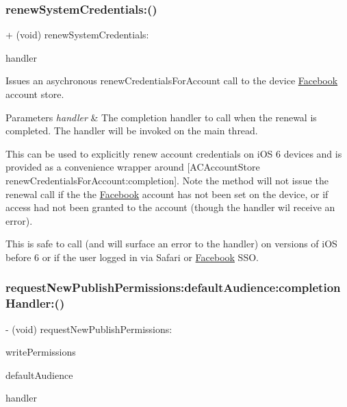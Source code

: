 \subsubsection{\texorpdfstring{renew\+System\+Credentials\+:()}{renewSystemCredentials:()}\hspace{0.1cm}{\footnotesize\ttfamily [5/5]}}
{\footnotesize\ttfamily + (void) renew\+System\+Credentials\+: \begin{DoxyParamCaption}\item[{(F\+B\+Session\+Renew\+System\+Credentials\+Handler)}]{handler }\end{DoxyParamCaption}}

Issues an asychronous renew\+Credentials\+For\+Account call to the device \hyperlink{interfaceFacebook}{Facebook} account store.


\begin{DoxyParams}{Parameters}
{\em handler} & The completion handler to call when the renewal is completed. The handler will be invoked on the main thread.\\
\hline
\end{DoxyParams}
This can be used to explicitly renew account credentials on i\+OS 6 devices and is provided as a convenience wrapper around {\ttfamily \mbox{[}A\+C\+Account\+Store renew\+Credentials\+For\+Account\+:completion\mbox{]}}. Note the method will not issue the renewal call if the the \hyperlink{interfaceFacebook}{Facebook} account has not been set on the device, or if access had not been granted to the account (though the handler wil receive an error).

This is safe to call (and will surface an error to the handler) on versions of i\+OS before 6 or if the user logged in via Safari or \hyperlink{interfaceFacebook}{Facebook} S\+SO. \mbox{\label{interfaceFBSession_a86dd849f0bd1f667e6107a13deb4607d}} 
\subsubsection{\texorpdfstring{request\+New\+Publish\+Permissions\+:default\+Audience\+:completion\+Handler\+:()}{requestNewPublishPermissions:defaultAudience:completionHandler:()}\hspace{0.1cm}{\footnotesize\ttfamily [1/5]}}
{\footnotesize\ttfamily -\/ (void) request\+New\+Publish\+Permissions\+: \begin{DoxyParamCaption}\item[{(N\+S\+Array $\ast$)}]{write\+Permissions }\item[{defaultAudience:(F\+B\+Session\+Default\+Audience)}]{default\+Audience }\item[{completionHandler:(F\+B\+Session\+Request\+Permission\+Result\+Handler)}]{handler }\end{DoxyParamCaption}}

